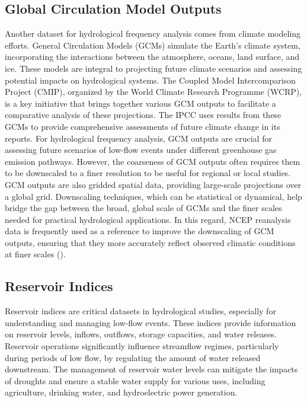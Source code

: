 \documentclass[
]{krantz}
\begin{document}
\subsection{Global Circulation Model Outputs}\label{global-circulation-model-outputs}

Another dataset for hydrological frequency analysis comes from climate modeling efforts. General Circulation Models (GCMs) simulate the Earth's climate system, incorporating the interactions between the atmosphere, oceans, land surface, and ice. These models are integral to projecting future climate scenarios and assessing potential impacts on hydrological systems. The Coupled Model Intercomparison Project (CMIP), organized by the World Climate Research Programme (WCRP), is a key initiative that brings together various GCM outputs to facilitate a comparative analysis of these projections. The IPCC uses results from these GCMs to provide comprehensive assessments of future climate change in its reports. For hydrological frequency analysis, GCM outputs are crucial for assessing future scenarios of low-flow events under different greenhouse gas emission pathways. However, the coarseness of GCM outputs often requires them to be downscaled to a finer resolution to be useful for regional or local studies. GCM outputs are also gridded spatial data, providing large-scale projections over a global grid. Downscaling techniques, which can be statistical or dynamical, help bridge the gap between the broad, global scale of GCMs and the finer scales needed for practical hydrological applications. In this regard, NCEP reanalysis data is frequently used as a reference to improve the downscaling of GCM outputs, ensuring that they more accurately reflect observed climatic conditions at finer scales (\citet{Gao2012}).

\subsection{Reservoir Indices}\label{reservoir-indices}

Reservoir indices are critical datasets in hydrological studies, especially for understanding and managing low-flow events. These indices provide information on reservoir levels, inflows, outflows, storage capacities, and water releases. Reservoir operations significantly influence streamflow regimes, particularly during periods of low flow, by regulating the amount of water released downstream. The management of reservoir water levels can mitigate the impacts of droughts and ensure a stable water supply for various uses, including agriculture, drinking water, and hydroelectric power generation.
\end{document}

